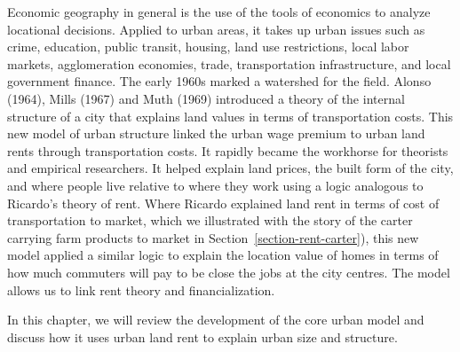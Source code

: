 Economic geography in general is the use of the tools of economics to analyze locational decisions. Applied to urban areas, it takes up urban issues such as crime, education, public transit, housing, land use restrictions, local labor markets, agglomeration economies, trade, transportation infrastructure, and local government finance. %
The early 1960s marked a watershed for the field.  Alonso (1964), Mills (1967) and Muth (1969) introduced a theory of the internal structure of a city that explains land values in terms of transportation costs. %
This new model of urban structure linked the \gls{urban wage premium} to urban land rents through transportation costs.  It rapidly became the workhorse for theorists and empirical researchers. It helped explain land prices, the built form of the city, and where people live relative to where they work using a logic analogous to Ricardo's theory of rent. Where Ricardo explained land rent in terms of cost of transportation to market, which we illustrated with the story of the carter carrying farm products to market in Section~\ref{section-rent-carter}), this new model applied a similar logic to explain the location value of homes in terms of how much commuters will pay to be close the jobs at the city centres. The model allows us to link rent theory and financialization. %

In this chapter, we will review the development of the core urban model and discuss how it uses urban land rent to explain urban size and structure. %

